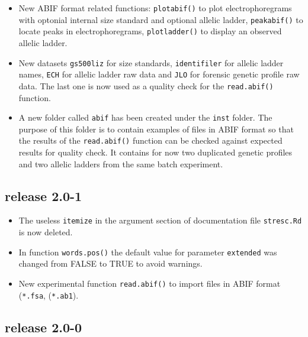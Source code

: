 \documentclass{article}
\begin{document}
\begin{itemize}

\item New ABIF format related functions: \texttt{plotabif()} to plot
electrophoregrams with optonial internal size standard and optional
allelic ladder, \texttt{peakabif()} to locate peaks in electrophoregrams,
\texttt{plotladder()} to display an observed allelic ladder.

\item New datasets \texttt{gs500liz} for size standards, \texttt{identifiler}
for allelic ladder names, \texttt{ECH} for allelic ladder raw data and
\texttt{JLO} for forensic genetic profile raw data. The last one is
now used as a quality check for the \texttt{read.abif()} function.

\item A new folder called \texttt{abif} has been created under the
\texttt{inst} folder. The purpose of this folder is to contain examples
of files in ABIF format so that the results of the \texttt{read.abif()} 
function can be checked against expected results for quality check.
It contains for now two duplicated genetic profiles and two allelic
ladders from the same batch experiment.

\end{itemize}

\subsection*{release 2.0-1}

\begin{itemize}

\item The useless \texttt{itemize} in the argument section of
  documentation file \texttt{stresc.Rd} is now deleted.

\item In function \texttt{words.pos()} the default value for parameter
  \texttt{extended} was changed from FALSE to TRUE to avoid warnings.

\item New experimental function \texttt{read.abif()} to import files
  in ABIF format (\texttt{*.fsa}, (\texttt{*.ab1}).

\end{itemize}

\subsection*{release 2.0-0}
\end{document}
